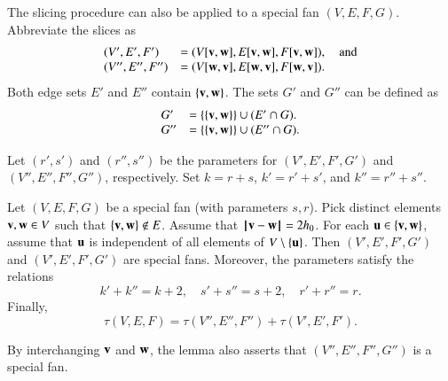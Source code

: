 The slicing procedure can also be applied to a special fan $(V,E,F,G)$.
Abbreviate the slices as
$$
\begin{array}{lll}
(V',E',F')&=(V[{\mathbf v},{\mathbf w}],E[{\mathbf v},{\mathbf w}],F[{\mathbf v},{\mathbf w}]),\quad\text{and}\\
 (V'',E'',F'')&= (V[{\mathbf w},{\mathbf v}],E[{\mathbf w},{\mathbf v}],F[{\mathbf w},{\mathbf v}]).
\end{array}
$$
Both edge sets $E'$ and $E''$ contain $\{{\mathbf v},{\mathbf w}\}$.  The sets $G'$ and $G''$ can be defined
as 
$$
\begin{array}{lll}
G' &= \{\{{\mathbf v},{\mathbf w}\}\} \cup (E'\cap G).\\
G'' &= \{\{{\mathbf v},{\mathbf w}\}\} \cup (E''\cap G).\\
\end{array}
$$ 

Let $(r',s')$ and $(r'',s'')$ be the parameters for $(V',E',F',G')$ and $(V'',E'',F'',G'')$, respectively.
Set $k=r+s$, $k'=r'+s'$, and $k''=r''+s''$.

\begin{lemma}\label{lemma:param-add}  
Let $(V,E,F,G)$ be a special fan (with parameters $s,r$).  
Pick distinct elements ${\mathbf v},{\mathbf w}\in V$  such that $\{{\mathbf v},{\mathbf w}\}\not\in E$.
Assume that ${\hskip0.1em|\hskip-0.15em|\hskip0.1em}{\mathbf v} - {\mathbf w}{\hskip0.1em|\hskip-0.15em|\hskip0.1em}=2{h_0}$.
For each ${\mathbf u}\in \{{\mathbf v},{\mathbf w}\}$, assume that ${\mathbf u}$ is independent of all elements of $V\setminus\{{\mathbf u}\}$.    
Then $(V',E',F',G')$ and $(V',E',F',G')$ are special fans.  Moreover,
the parameters satisfy the relations
$$
k'+k'' = k + 2,\quad s'+s'' = s + 2,\quad r'+r''=r.
$$
Finally,
$$
\tau(V,E,F)= \tau(V'',E'',F'') +\tau(V',E',F').
$$
\end{lemma}

By interchanging ${\mathbf v}$ and ${\mathbf w}$, the lemma also asserts that $(V'',E'',F'',G'')$ is a special fan.

